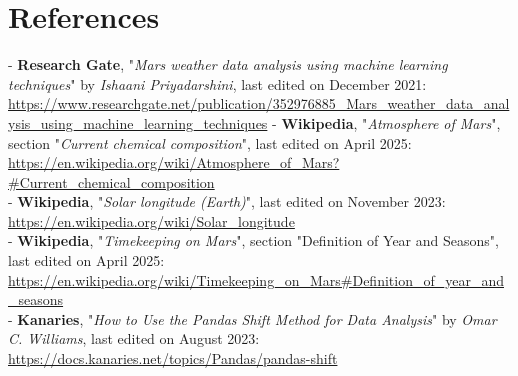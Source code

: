 \documentclass[10pt,a4paper,oneside]{article}
\begin{document}
\section{References}
- \textbf{Research Gate}, "\textit{Mars weather data analysis using machine learning techniques}" by \textit{Ishaani Priyadarshini}, last edited on December 2021: \url{https://www.researchgate.net/publication/352976885_Mars_weather_data_analysis_using_machine_learning_techniques}
- \textbf{Wikipedia}, "\textit{Atmosphere of Mars}", section "\textit{Current chemical composition}", last edited on April 2025: \url{https://en.wikipedia.org/wiki/Atmosphere_of_Mars?#Current_chemical_composition}\\
- \textbf{Wikipedia}, "\textit{Solar longitude (Earth)}", last edited on November 2023: \url{https://en.wikipedia.org/wiki/Solar_longitude}\\
- \textbf{Wikipedia}, "\textit{Timekeeping on Mars}", section "Definition of Year and Seasons", last edited on April 2025: \url{https://en.wikipedia.org/wiki/Timekeeping_on_Mars#Definition_of_year_and_seasons}\\
- \textbf{Kanaries}, "\textit{How to Use the Pandas Shift Method for Data Analysis}" by \textit{Omar C. Williams}, last edited on August 2023: \url{https://docs.kanaries.net/topics/Pandas/pandas-shift}\\
\end{document}

